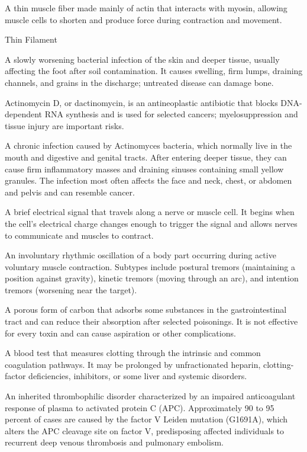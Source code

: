  A thin muscle fiber made mainly of actin that interacts with myosin, allowing muscle cells to shorten and produce force during contraction and movement.

\synonyms
Thin Filament

 A slowly worsening bacterial infection of the skin and deeper tissue, usually affecting the foot after soil contamination. It causes swelling, firm lumps, draining channels, and grains in the discharge; untreated disease can damage bone.

 Actinomycin D, or dactinomycin, is an antineoplastic antibiotic that blocks DNA-dependent RNA synthesis and is used for selected cancers; myelosuppression and tissue injury are important risks.

 A chronic infection caused by Actinomyces bacteria, which normally live in the mouth and digestive and genital tracts. After entering deeper tissue, they can cause firm inflammatory masses and draining sinuses containing small yellow granules. The infection most often affects the face and neck, chest, or abdomen and pelvis and can resemble cancer.

 A brief electrical signal that travels along a nerve or muscle cell. It begins when the cell’s electrical charge changes enough to trigger the signal and allows nerves to communicate and muscles to contract.

 An involuntary rhythmic oscillation of a body part occurring during active voluntary muscle contraction. Subtypes include postural tremors (maintaining a position against gravity), kinetic tremors (moving through an arc), and intention tremors (worsening near the target).

 A porous form of carbon that adsorbs some substances in the gastrointestinal tract and can reduce
their absorption after selected poisonings. It is not effective for every toxin and can
cause aspiration or other complications.

 A blood test that measures clotting through the intrinsic and common coagulation pathways.
It may be prolonged by unfractionated heparin, clotting-factor deficiencies, inhibitors,
or some liver and systemic disorders.

 An inherited thrombophilic disorder characterized by an impaired anticoagulant response of plasma to activated protein C (APC). Approximately 90 to 95 percent of cases are caused by the factor V Leiden mutation (G1691A), which alters the APC cleavage site on factor V, predisposing affected individuals to recurrent deep venous thrombosis and pulmonary embolism.

